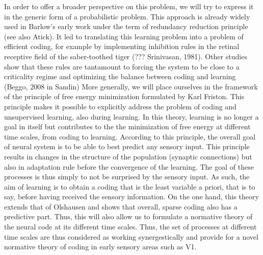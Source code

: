 \documentclass[a4paper, 11pt, draft]{article} %
\begin{document}
In order to offer a broader perspective on this problem, we will try to express it in the generic form of a probabilistic problem. This approach is already widely used in Barlow's early work under the term of redundancy reduction principle (see also Atick). It led to translating this learning problem into a problem of efficient coding, for example by implementing inhibition rules in the retinal receptive field of the saber-toothed tiger (??? Srinivasan, 1981). Other studies show that these rules are tantamount to forcing the system to be close to a criticality regime and optimizing the balance between coding and learning (Beggo, 2008 in Sandin) More generally, we will place ourselves in the framework of the principle of free energy minimization formulated by Karl Friston. This principle makes it possible to explicitly address the problem of coding and unsupervised learning, also during learning. In this theory, learning is no longer a goal in itself but contributes to the the minimization of free energy at different time scales, from coding to learning. According to this principle, the overall goal of neural system is to be able to best predict any sensory input. This principle results in changes in the structure of the population (synaptic connections) but also in adaptation rule before the convergence of the learning. The goal of these processes is thus simply to not be surprised by the sensory input. As such, the aim of learning is to obtain a coding that is the least variable a priori, that is to say, before having received the sensory information. On the one hand, this theory extends that of Olshausen and shows that overall, sparse coding also has a predictive part. Thus, this will also allow us to formulate a normative theory of the neural code at its different time scales. Thus, the set of processes at different time scales are thus considered as working synergestically and provide for a novel normative theory of coding in early sensory areas such as V1.
\end{document}
